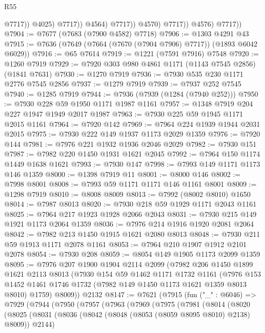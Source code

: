 \begin{lexlean}{R55}
\begin{coremodule}
                                @7717))
                            @4025)
                          @7717))
                      @4564)
                    @7717))
                @4570)
              @7717))
          @4576)
        @7717))
@7904 := @7677 (@7683 (@7900 @4582) @7718)
@7906 := @1303 @4291 @43
@7915 := @7636 (@7649 (@7664 (@7670 (@7904 @7906) @7717)) (@1893 @6042 @6029))
@7916 := @65 @7614
@7919 := @1221 (@7591 @7916) @7548
@7920 := @1260 @7919
@7929 := @7920 @303 @980 @4861 @1171 (@1143 @7545 @2856) (@1841 @7631)
@7930 := @1270 @7919
@7936 := @7930 @535 @230 @1171 @2776 @7545 @2856
@7937 := @1279 @7919
@7939 := @7937 @252 @7545
@7940 := @1285 @7919
@7944 := @7936 (@7939 (@1284 (@7940 @252)))
@7950 := @7930 @228 @59 @1950 @1171 @1987 @1161
@7957 := @1348 @7919 @204 @227 @1947 @1949 @2017 @1987
@7963 := @7930 @225 @59 @1945 @1171 @2015 @1161
@7964 := @7920 @142
@7969 := @7964 @224 @1939 @1944 @2031 @2015
@7975 := @7930 @222 @149 @1937 @1173 @2029 @1359
@7976 := @7920 @144
@7981 := @7976 @221 @1932 @1936 @2046 @2029
@7982 := @7930 @151
@7987 := @7982 @220 @1450 @1931 @1621 @2045
@7992 := @7964 @150 @1174 @1449 @1638 @1621
@7993 := @7930 @147
@7998 := @7993 @149 @1171 @1173 @146 @1359
@8000 := @1398 @7919 @11
@8001 := @8000 @146
@8002 := @7998 @8001
@8008 := @7993 @59 @1171 @1171 @146 @1161 @8001
@8009 := @1298 @7919
@8010 := @8008 @8009
@8013 := @7992 (@8002 @8010) @1650
@8014 := @7987 @8013
@8020 := @7930 @218 @59 @1929 @1171 @2043 @1161
@8025 := @7964 @217 @1923 @1928 @2066 @2043
@8031 := @7930 @215 @149 @1921 @1173 @2064 @1359
@8036 := @7976 @214 @1916 @1920 @2081 @2064
@8042 := @7982 @213 @1450 @1915 @1621 @2080 @8013
@8048 := @7930 @211 @59 @1913 @1171 @2078 @1161
@8053 := @7964 @210 @1907 @1912 @2101 @2078
@8054 := @7930 @208
@8059 := @8054 @149 @1905 @1173 @2099 @1359
@8095 := @7976
    @207
    @1900
    @1904
    @2114
    @2099
    (@7982
      @206
      @1450
      @1899
      @1621
      @2113
      @8013
      (@7930
        @154
        @59
        @1462
        @1171
        @1732
        @1161
        (@7976 @153 @1452 @1461 @1746 @1732 (@7982 @149 @1450 @1173 @1621 @1359 @8013 @8010) @1759)
        @8009))
    @2132
@8147 := @7621
    (@7915
      (fun ("_" : @6046) =>
      @7929
        (@7944
          (@7950
            (@7957
              (@7963
                (@7969
                  (@7975
                    (@7981
                      (@8014
                        (@8020
                          (@8025
                            (@8031
                              (@8036 (@8042 (@8048 (@8053 (@8059 @8095 @8010) @2138) @8009)) @2144)

\end{coremodule}
\end{lexlean}
